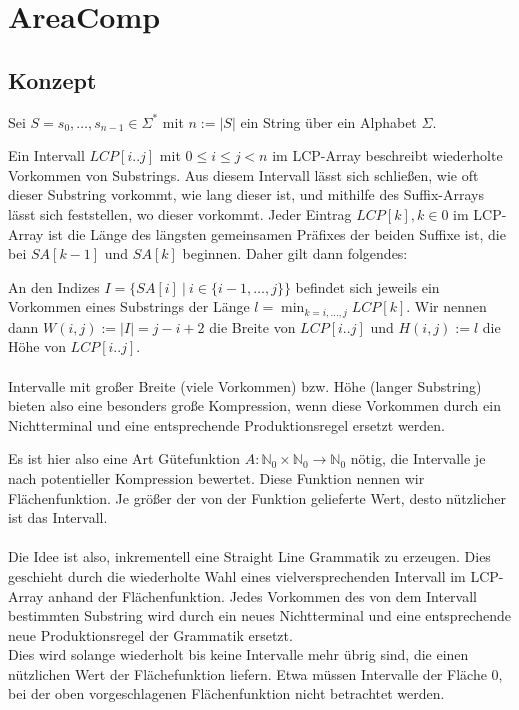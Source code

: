 \chapter{AreaComp}

\section{Konzept}

Sei $S = s_0, \dots, s_{n-1} \in \Sigma^*$ mit $n := |S|$ ein String über ein Alphabet $\Sigma$.

Ein Intervall $LCP[i..j]$ mit $0 \leq i \leq j < n$ im LCP-Array beschreibt wiederholte Vorkommen von Substrings. Aus diesem Intervall lässt sich schließen, wie oft dieser Substring vorkommt, wie lang dieser ist, und mithilfe des Suffix-Arrays lässt sich feststellen, wo dieser vorkommt. Jeder Eintrag $LCP[k], k \in 0$ im LCP-Array ist die Länge des längsten gemeinsamen Präfixes der beiden Suffixe ist, die bei $SA[k-1]$ und $SA[k]$ beginnen. Daher gilt dann folgendes:

An den Indizes $I = \{SA[i]\ |\ i \in \{i-1, \dots, j\}\}$ befindet sich jeweils ein Vorkommen eines Substrings der Länge $l = \min_{k = i, \dots, j} LCP[k]$. Wir nennen dann $W(i, j) := |I| = j - i + 2$ die Breite von $LCP[i..j]$ und $H(i, j) := l$ die Höhe von $LCP[i..j]$.\\\\
Intervalle mit großer Breite (viele Vorkommen) bzw. Höhe (langer Substring) bieten also eine besonders große Kompression, wenn diese Vorkommen durch ein Nichtterminal und eine entsprechende Produktionsregel ersetzt werden.

Es ist hier also eine Art Gütefunktion $A: \mathbb{N}_0 \times \mathbb{N}_0 \rightarrow \mathbb{N}_0$ nötig, die Intervalle je nach potentieller Kompression bewertet. Diese Funktion nennen wir Flächenfunktion. Je größer der von der Funktion gelieferte Wert, desto nützlicher ist das Intervall.\\\\
Die Idee ist also, inkrementell eine Straight Line Grammatik zu erzeugen. Dies geschieht durch die wiederholte Wahl eines vielversprechenden Intervall im LCP-Array anhand der Flächenfunktion. Jedes Vorkommen des von dem Intervall bestimmten Substring wird durch ein neues Nichtterminal und eine entsprechende neue Produktionsregel der Grammatik ersetzt.\\

Dies wird solange wiederholt bis keine Intervalle mehr übrig sind, die einen nützlichen Wert der Flächefunktion liefern. Etwa müssen Intervalle der Fläche $0$, bei der oben vorgeschlagenen Flächenfunktion nicht betrachtet werden.\\

